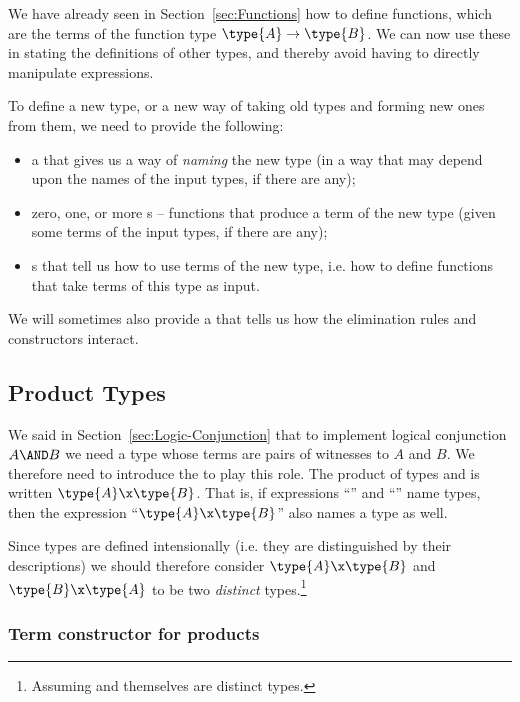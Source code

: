 We have already seen in Section~\ref{sec:Functions} how to define functions, which are the terms of the function type $\type{A} \to \type{B}$.  We can now use these in stating the definitions of other types, and thereby avoid having to directly manipulate expressions.

To define a new type, or a new way of taking old types and forming new ones from them, we need to provide the following:
\begin{itemize}
\item a  that gives us a way of \emph{naming} the new type (in a way that may depend upon the names of the input types, if there are any);
\item zero, one, or more s -- functions that produce a term of the new type (given some terms of the input types, if there are any);
\item {}s that tell us how to use terms of the new type, i.e. how to define functions that take terms of this type as input.
\end{itemize}
We will sometimes also provide a  that tells us how the elimination rules and constructors interact.





\subsection{Product Types}
\label{sec:SimpleTT-Product}

We said in Section~\ref{sec:Logic-Conjunction} that to implement logical conjunction $A \AND B$ we need a type whose terms are pairs of witnesses to $A$ and $B$.  We therefore need to introduce the  to play this role.  
The product of types  and  is written $\type{A} \x \type{B}$.  That is, if expressions ``'' and ``'' 
name types, then the expression ``$\type{A} \x \type{B}$'' also names a type as well.

Since types are defined intensionally (i.e. they are distinguished by their descriptions) we should therefore consider $\type{A} \x \type{B}$ and $\type{B} \x \type{A}$ to be two \emph{distinct} types.\footnote{
Assuming  and  themselves are distinct types.}


\subsubsection{Term constructor for products}

